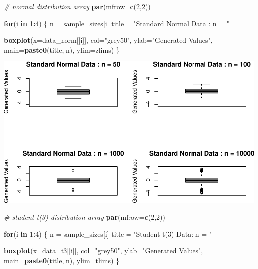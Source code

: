 \documentclass[9pt,letter]{article}
\newenvironment{Shaded}{\begin{snugshade}}{\end{snugshade}}
\newcommand{\KeywordTok}[1]{\textcolor[rgb]{0.13,0.29,0.53}{\textbf{#1}}}
\newcommand{\DataTypeTok}[1]{\textcolor[rgb]{0.13,0.29,0.53}{#1}}
\newcommand{\DecValTok}[1]{\textcolor[rgb]{0.00,0.00,0.81}{#1}}
\newcommand{\StringTok}[1]{\textcolor[rgb]{0.31,0.60,0.02}{#1}}
\newcommand{\CommentTok}[1]{\textcolor[rgb]{0.56,0.35,0.01}{\textit{#1}}}
\newcommand{\ControlFlowTok}[1]{\textcolor[rgb]{0.13,0.29,0.53}{\textbf{#1}}}
\newcommand{\OperatorTok}[1]{\textcolor[rgb]{0.81,0.36,0.00}{\textbf{#1}}}
\newcommand{\NormalTok}[1]{#1}
\begin{document}
\begin{Shaded}
\begin{Highlighting}[]
\CommentTok{# normal distribution array}
\KeywordTok{par}\NormalTok{(}\DataTypeTok{mfrow=}\KeywordTok{c}\NormalTok{(}\DecValTok{2}\NormalTok{,}\DecValTok{2}\NormalTok{))}

\ControlFlowTok{for}\NormalTok{(i }\ControlFlowTok{in} \DecValTok{1}\OperatorTok{:}\DecValTok{4}\NormalTok{) \{}
\NormalTok{  n =}\StringTok{ }\NormalTok{sample_sizes[i]}
\NormalTok{  title =}\StringTok{ "Standard Normal Data : n = "}
  
  \KeywordTok{boxplot}\NormalTok{(}\DataTypeTok{x=}\NormalTok{data_norm[[i]], }\DataTypeTok{col=}\StringTok{"grey50"}\NormalTok{,}
      \DataTypeTok{ylab=}\StringTok{"Generated Values"}\NormalTok{,}
      \DataTypeTok{main=}\KeywordTok{paste0}\NormalTok{(title, n),}
      \DataTypeTok{ylim=}\NormalTok{zlims)}
\NormalTok{\}}
\end{Highlighting}
\end{Shaded}

\includegraphics{a3_solutions_files/figure-latex/unnamed-chunk-8-1.pdf}

\begin{Shaded}
\begin{Highlighting}[]
\CommentTok{# student t(3) distribution array}
\KeywordTok{par}\NormalTok{(}\DataTypeTok{mfrow=}\KeywordTok{c}\NormalTok{(}\DecValTok{2}\NormalTok{,}\DecValTok{2}\NormalTok{))}

\ControlFlowTok{for}\NormalTok{(i }\ControlFlowTok{in} \DecValTok{1}\OperatorTok{:}\DecValTok{4}\NormalTok{) \{}
\NormalTok{  n =}\StringTok{ }\NormalTok{sample_sizes[i]}
\NormalTok{  title =}\StringTok{ "Student t(3) Data: n = "}
  
  \KeywordTok{boxplot}\NormalTok{(}\DataTypeTok{x=}\NormalTok{data_t3[[i]], }\DataTypeTok{col=}\StringTok{"grey50"}\NormalTok{,}
      \DataTypeTok{ylab=}\StringTok{"Generated Values"}\NormalTok{,}
      \DataTypeTok{main=}\KeywordTok{paste0}\NormalTok{(title, n),}
      \DataTypeTok{ylim=}\NormalTok{tlims)}
\NormalTok{\}}
\end{Highlighting}
\end{Shaded}
\end{document}
